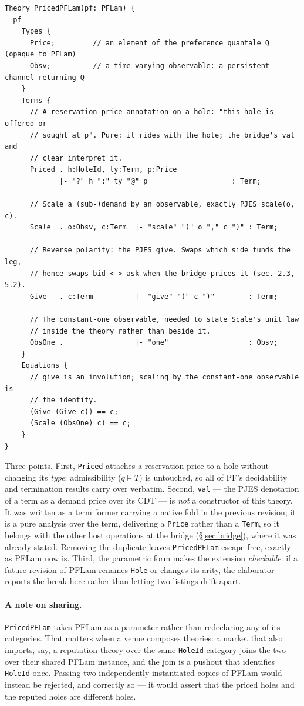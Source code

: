 \documentclass[11pt]{article}
\theoremstyle{definition}
\newcommand{\PF}{\textsf{PF}}
\newcommand{\PFLam}{\textsf{PFLam}}
\newcommand{\modelsT}{\models}
\begin{document}
\begin{lstlisting}[style=rho]
Theory PricedPFLam(pf: PFLam) {
  pf
    Types {
      Price;         // an element of the preference quantale Q (opaque to PFLam)
      Obsv;          // a time-varying observable: a persistent channel returning Q
    }
    Terms {
      // A reservation price annotation on a hole: "this hole is offered or
      // sought at p". Pure: it rides with the hole; the bridge's val and
      // clear interpret it.
      Priced . h:HoleId, ty:Term, p:Price
             |- "?" h ":" ty "@" p                    : Term;

      // Scale a (sub-)demand by an observable, exactly PJES scale(o, c).
      Scale  . o:Obsv, c:Term  |- "scale" "(" o "," c ")" : Term;

      // Reverse polarity: the PJES give. Swaps which side funds the leg,
      // hence swaps bid <-> ask when the bridge prices it (sec. 2.3, 5.2).
      Give   . c:Term          |- "give" "(" c ")"        : Term;

      // The constant-one observable, needed to state Scale's unit law
      // inside the theory rather than beside it.
      ObsOne .                 |- "one"                   : Obsv;
    }
    Equations {
      // give is an involution; scaling by the constant-one observable is
      // the identity.
      (Give (Give c)) == c;
      (Scale (ObsOne) c) == c;
    }
}
\end{lstlisting}

\noindent Three points. First, \texttt{Priced} attaches a reservation price to a hole without
changing its \emph{type}: admissibility ($q \modelsT T$) is untouched, so all of \PF{}'s decidability
and termination results carry over verbatim. Second, \texttt{val} --- the PJES denotation of a term
as a demand price over its CDT --- is \emph{not} a constructor of this theory. It was written as a
term former carrying a native fold in the previous revision; it is a pure analysis over the term,
delivering a \texttt{Price} rather than a \texttt{Term}, so it belongs with the other host operations
at the bridge (\S\ref{sec:bridge}), where it was already stated. Removing the duplicate leaves
\texttt{PricedPFLam} escape-free, exactly as \PFLam{} now is. Third, the parametric form makes the
extension \emph{checkable}: if a future revision of \PFLam{} renames \texttt{Hole} or changes its
arity, the elaborator reports the break here rather than letting two listings drift apart.

\paragraph{A note on sharing.} \texttt{PricedPFLam} takes \PFLam{} as a parameter rather than
redeclaring any of its categories. That matters when a venue composes theories: a market that also
imports, say, a reputation theory over the same \texttt{HoleId} category joins the two over their
shared \PFLam{} instance, and the join is a pushout that identifies \texttt{HoleId} once. Passing
two independently instantiated copies of \PFLam{} would instead be rejected, and correctly so ---
it would assert that the priced holes and the reputed holes are different holes.
\end{document}
